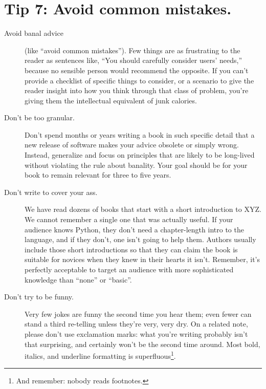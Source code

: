 \documentclass[10pt,letterpaper]{article}
\begin{document}
\section*{Tip 7: Avoid common mistakes.}

\begin{description}

\item[Avoid banal advice]
  (like ``avoid common mistakes'').
  Few things are as frustrating to the reader as sentences like,
  ``You should carefully consider users' needs,''
  because no sensible person would recommend the opposite.
  If you can't provide a checklist of specific things to consider,
  or a scenario to give the reader insight into how you think through that class of problem,
  you're giving them the intellectual equivalent of junk calories.
  
\item[Don't be too granular.]
  Don't spend months or years writing a book in such specific detail
  that a new release of software makes your advice obsolete or simply wrong.
  Instead, generalize and focus on principles that are likely to be long-lived
  without violating the rule about banality.
  Your goal should be for your book to remain relevant for three to five years.
  
\item[Don't write to cover your ass.]
  We have read dozens of books that start with a short introduction to XYZ.
  We cannot remember a single one that was actually useful.
  If your audience knows Python,
  they don't need a chapter-length intro to the language,
  and if they don't,
  one isn't going to help them.
  Authors usually include those short introductions
  so that they can claim the book is suitable for novices
  when they knew in their hearts it isn't.
  Remember,
  it's perfectly acceptable to target an audience with more sophisticated knowledge
  than ``none'' or ``basic''.
  
\item[Don't try to be funny.]
  Very few jokes are funny the second time you hear them;
  even fewer can stand a third re-telling unless they're very, very dry.
  On a related note,
  please don't use exclamation marks:
  what you're writing probably isn't that surprising,
  and certainly won't be the second time around.
  Most bold, italics, and underline formatting is superfluous\footnote{And remember: nobody reads footnotes.}.

\end{description}
\end{document}
